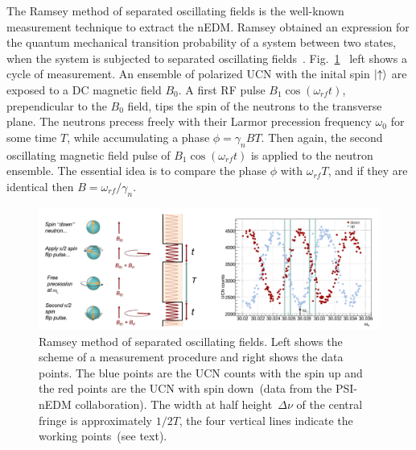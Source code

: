 The Ramsey method of separated oscillating fields is the well-known
measurement technique to extract the nEDM. Ramsey obtained an
expression for the quantum mechanical transition probability of a
system between two states, when the system is subjected to separated
oscillating
fields~\cite{ramsey1950}. Fig.~\ref{fig:ramsey}~\cite{Schmidt2016}
left shows a cycle of measurement. An ensemble of polarized UCN with
the inital spin $\ket{ \uparrow}$ are exposed to a DC magnetic field
$B_0$.  A first RF pulse $B_1 \cos (\omega_{rf}t)$, prependicular to
the $B_0$ field, tips the spin of the neutrons to the transverse
plane. The neutrons precess freely with their Larmor precession
frequency $\omega_0$ for some time $T$, while accumulating a phase
$\phi = \gamma_n BT$. Then again, the second oscillating magnetic
field pulse of $B_1 \cos (\omega_{rf}t)$ is applied to the neutron
ensemble. The essential idea is to compare the phase $\phi$ with
$\omega_{rf}T$, and if they are identical then
$B= \omega_{rf} / \gamma_n$.

\begin{figure}[h]
  \centering
  \includegraphics[width=1.0\textwidth]{ramsey.png}
  \caption{\cite{Schmidt-Wellenburg:2016nfv} Ramsey method of separated
    oscillating fields. Left shows the scheme of a measurement
    procedure and right shows the data points. The blue points are the
    UCN counts with the spin up and the red points are the UCN with
    spin down~(data from the PSI-nEDM collaboration). The width at
    half height~$\Delta \nu$ of the central fringe is approximately
    $1/2T$, the four vertical lines indicate the working points~(see
    text).}
  \label{fig:ramsey}
\end{figure}

